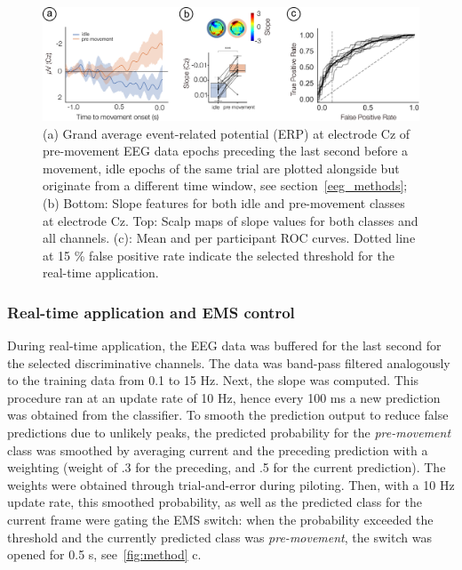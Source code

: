 \begin{figure}[t]
    \centering
    \includegraphics[width=\textwidth]{figures/eeg_results_new.pdf}
    \caption{(a) Grand average event-related potential (ERP) at electrode Cz of pre-movement EEG data epochs preceding the last second before a movement, idle epochs of the same trial are plotted alongside but originate from a different time window, see section~\ref{eeg_methods}; (b) Bottom: Slope features for both idle and pre-movement classes at electrode Cz. Top: Scalp maps of slope values for both classes and all channels. (c): Mean and per participant ROC curves. Dotted line at 15 \% false positive rate indicate the selected threshold for the real-time application.}
    \label{fig:EEG_results}
\end{figure}


\subsubsection{Real-time application and EMS control}
During real-time application, the EEG data was buffered for the last second for the selected discriminative channels. The data was band-pass filtered analogously to the training data from 0.1 to 15 Hz. Next, the slope was computed. This procedure ran at an update rate of 10 Hz, hence every 100 ms a new prediction was obtained from the classifier. To smooth the prediction output to reduce false predictions due to unlikely peaks, the predicted probability for the \textit{pre-movement} class was smoothed by averaging current and the preceding prediction with a weighting (weight of .3 for the preceding, and .5 for the current prediction). The weights were obtained through trial-and-error during piloting. Then, with a 10 Hz update rate, this smoothed probability, as well as the predicted class for the current frame were gating the EMS switch: when the probability exceeded the threshold and the currently predicted class was \textit{pre-movement}, the switch was opened for 0.5 s, see~\ref{fig:method} c.


